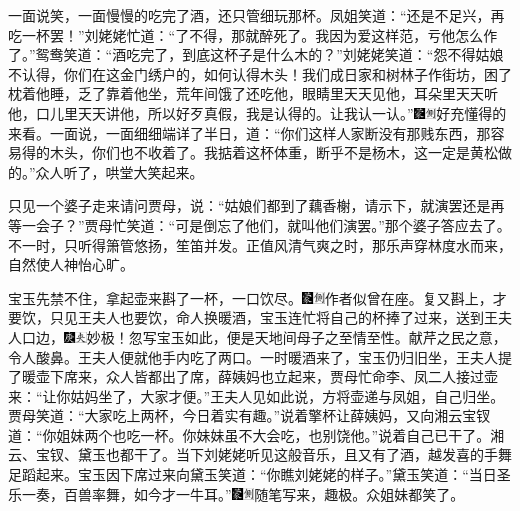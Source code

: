一面说笑，一面慢慢的吃完了酒，还只管细玩那杯。凤姐笑道：``还是不足兴，再吃一杯罢！''刘姥姥忙道：``了不得，那就醉死了。我因为爱这样范，亏他怎么作了。''鸳鸯笑道：``酒吃完了，到底这杯子是什么木的？''刘姥姥笑道：``怨不得姑娘不认得，你们在这金门绣户的，如何认得木头！我们成日家和树林子作街坊，困了枕着他睡，乏了靠着他坐，荒年间饿了还吃他，眼睛里天天见他，耳朵里天天听他，口儿里天天讲他，所以好歹真假，我是认得的。让我认一认。''{\includegraphics[width=3mm]{../Images/00006}\includegraphics[width=3mm]{../Images/00011}\footnotesize \kaishu 好充懂得的来看。}一面说，一面细细端详了半日，道：``你们这样人家断没有那贱东西，那容易得的木头，你们也不收着了。我掂着这杯体重，断乎不是杨木，这一定是黄松做的。''众人听了，哄堂大笑起来。

只见一个婆子走来请问贾母，说：``姑娘们都到了藕香榭，请示下，就演罢还是再等一会子？''贾母忙笑道：``可是倒忘了他们，就叫他们演罢。''那个婆子答应去了。不一时，只听得箫管悠扬，笙笛并发。正值风清气爽之时，那乐声穿林度水而来，自然使人神怡心旷。

宝玉先禁不住，拿起壶来斟了一杯，一口饮尽。{\includegraphics[width=3mm]{../Images/00006}\includegraphics[width=3mm]{../Images/00011}\footnotesize \kaishu 作者似曾在座。}复又斟上，才要饮，只见王夫人也要饮，命人换暖酒，宝玉连忙将自己的杯捧了过来，送到王夫人口边，{\includegraphics[width=3mm]{../Images/00004}\includegraphics[width=3mm]{../Images/00012}\footnotesize \kaishu 妙极！忽写宝玉如此，便是天地间母子之至情至性。献芹之民之意，令人酸鼻。}王夫人便就他手内吃了两口。一时暖酒来了，宝玉仍归旧坐，王夫人提了暖壶下席来，众人皆都出了席，薛姨妈也立起来，贾母忙命李、凤二人接过壶来：``让你姑妈坐了，大家才便。''王夫人见如此说，方将壶递与凤姐，自己归坐。贾母笑道：``大家吃上两杯，今日着实有趣。''说着擎杯让薛姨妈，又向湘云宝钗道：``你姐妹两个也吃一杯。你妹妹虽不大会吃，也别饶他。''说着自己已干了。湘云、宝钗、黛玉也都干了。当下刘姥姥听见这般音乐，且又有了酒，越发喜的手舞足蹈起来。宝玉因下席过来向黛玉笑道：``你瞧刘姥姥的样子。''黛玉笑道：``当日圣乐一奏，百兽率舞，如今才一牛耳。''{\includegraphics[width=3mm]{../Images/00006}\includegraphics[width=3mm]{../Images/00011}\footnotesize \kaishu 随笔写来，趣极。}众姐妹都笑了。

